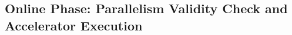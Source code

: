 





\subsection{Online Phase: Parallelism Validity Check and Accelerator Execution}
\label{onlinephase}


